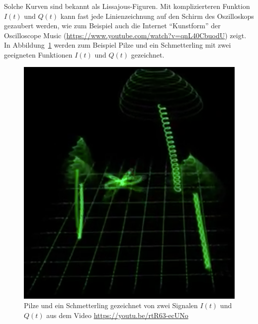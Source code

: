 Solche Kurven sind bekannt als Lissajous-Figuren.
Mit komplizierteren Funktion $I(t)$ und $Q(t)$ kann fast jede
Linienzeichnung auf den Schirm des Oszilloskops gezaubert werden,
wie zum Beispiel auch die Internet ``Kunstform'' der Oscilloscope
Music (\url{https://www.youtube.com/watch?v=qnL40CbuodU}) zeigt.
In Abbildung~\ref{figure:qam:pilze} werden zum Beispiel Pilze und
ein Schmetterling mit zwei geeigneten Funktionen $I(t)$ und $Q(t)$
gezeichnet.

\begin{figure}
\centering
\includegraphics[width=0.5\hsize]{applications/qam/pilze.png}
\caption{Pilze und ein Schmetterling gezeichnet von zwei Signalen
$I(t)$ und $Q(t)$ aus dem Video \url{https://youtu.be/rtR63-ecUNo}
\label{figure:qam:pilze}}
\end{figure}



